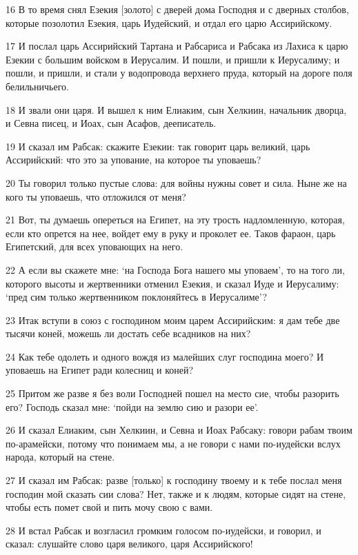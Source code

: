\par 16 В то время снял Езекия [золото] с дверей дома Господня и с дверных столбов, которые позолотил Езекия, царь Иудейский, и отдал его царю Ассирийскому.
\par 17 И послал царь Ассирийский Тартана и Рабсариса и Рабсака из Лахиса к царю Езекии с большим войском в Иерусалим. И пошли, и пришли к Иерусалиму; и пошли, и пришли, и стали у водопровода верхнего пруда, который на дороге поля белильничьего.
\par 18 И звали они царя. И вышел к ним Елиаким, сын Хелкиин, начальник дворца, и Севна писец, и Иоах, сын Асафов, дееписатель.
\par 19 И сказал им Рабсак: скажите Езекии: так говорит царь великий, царь Ассирийский: что это за упование, на которое ты уповаешь?
\par 20 Ты говорил только пустые слова: для войны нужны совет и сила. Ныне же на кого ты уповаешь, что отложился от меня?
\par 21 Вот, ты думаешь опереться на Египет, на эту трость надломленную, которая, если кто опрется на нее, войдет ему в руку и проколет ее. Таков фараон, царь Египетский, для всех уповающих на него.
\par 22 А если вы скажете мне: `на Господа Бога нашего мы уповаем', то на того ли, которого высоты и жертвенники отменил Езекия, и сказал Иуде и Иерусалиму: `пред сим только жертвенником поклоняйтесь в Иерусалиме'?
\par 23 Итак вступи в союз с господином моим царем Ассирийским: я дам тебе две тысячи коней, можешь ли достать себе всадников на них?
\par 24 Как тебе одолеть и одного вождя из малейших слуг господина моего? И уповаешь на Египет ради колесниц и коней?
\par 25 Притом же разве я без воли Господней пошел на место сие, чтобы разорить его? Господь сказал мне: `пойди на землю сию и разори ее'.
\par 26 И сказал Елиаким, сын Хелкиин, и Севна и Иоах Рабсаку: говори рабам твоим по-арамейски, потому что понимаем мы, а не говори с нами по-иудейски вслух народа, который на стене.
\par 27 И сказал им Рабсак: разве [только] к господину твоему и к тебе послал меня господин мой сказать сии слова? Нет, также и к людям, которые сидят на стене, чтобы есть помет свой и пить мочу свою с вами.
\par 28 И встал Рабсак и возгласил громким голосом по-иудейски, и говорил, и сказал: слушайте слово царя великого, царя Ассирийского!
